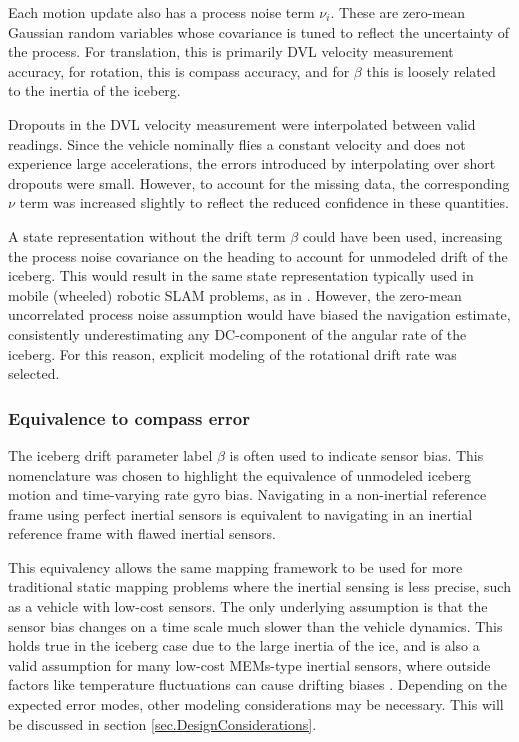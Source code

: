 Each motion update also has a process noise term $\nu_i$. These are zero-mean Gaussian random variables whose covariance is tuned to reflect the uncertainty of the process. For translation, this is primarily DVL velocity measurement accuracy, for rotation, this is compass accuracy, and for $\beta$ this is loosely related to the inertia of the iceberg. 

Dropouts in the DVL velocity measurement were interpolated between valid readings. Since the vehicle nominally flies a constant velocity and does not experience large accelerations, the errors introduced by interpolating over short dropouts were small. However, to account for the missing data, the corresponding $\nu$ term was increased slightly to reflect the reduced confidence in these quantities.

A state representation without the drift term $\beta$ could have been used, increasing the process noise covariance on the heading to account for unmodeled drift of the iceberg. This would result in the same state representation typically used in mobile (wheeled) robotic SLAM problems, as in \cite{Thrun2005}. However, the zero-mean uncorrelated process noise assumption would have biased the navigation estimate, consistently underestimating any DC-component of the angular rate of the iceberg. For this reason, explicit modeling of the rotational drift rate was selected.

\subsubsection{Equivalence to compass error}

The iceberg drift parameter label $\beta$ is often used to indicate sensor bias. This nomenclature was chosen to highlight the equivalence of unmodeled iceberg motion and time-varying rate gyro bias. Navigating in a non-inertial reference frame using perfect inertial sensors is equivalent to navigating in an inertial reference frame with flawed inertial sensors. 

This equivalency allows the same mapping framework to be used for more traditional static mapping problems where the inertial sensing is less precise, such as a vehicle with low-cost sensors. The only underlying assumption is that the sensor bias changes on a time scale much slower than the vehicle dynamics. This holds true in the iceberg case due to the large inertia of the ice, and is also a valid assumption for many low-cost MEMs-type inertial sensors, where outside factors like temperature fluctuations can cause drifting biases \cite{Keymeulen2005}. Depending on the expected error modes, other modeling considerations may be necessary. This will be discussed in section \ref{sec.DesignConsiderations}.


